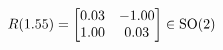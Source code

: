 \documentclass[preview]{standalone}
\begin{document}
\begin{align*}
\special{dvisvgm:raw <g id='unique000'>}R(1.55) = \begin{bmatrix} 0.03 & -1.00 \\ 1.00 & 0.03 \end{bmatrix} \in \text{SO}(2)\special{dvisvgm:raw </g>}
\end{align*}
\end{document}
